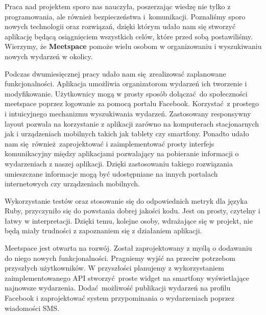 Praca nad projektem sporo nas nauczyła, poszerzając wiedzę nie tylko z programowania, ale również bezpieczeństwa i~komunikacji.
Poznaliśmy sporo nowych technologii oraz rozwiązań, dzięki którym udało nam się stworzyć aplikację będącą osiągnięciem wszystkich celów, które przed sobą postawiliśmy.
Wierzymy, że \textbf{Meetspace} pomoże wielu osobom w organizowaniu i wyszukiwaniu nowych wydarzeń w okolicy.

Podczas dwumiesięcznej pracy udało nam się zrealizować zaplanowane funkcjonalności.
Aplikacja umożliwia organizatorom wydarzeń ich tworzenie i modyfikowanie.
Użytkownicy mogą w prosty sposób dołączać do społeczności meetspace poprzez logowanie za pomocą portalu Facebook. Korzystać z prostego i intuicyjnego mechanizmu wyszukiwania wydarzeń.
Zastosowany responsywny layout pozwala na korzystanie z aplikacji zarówno na komputerach stacjonarnych jak i urządzeniach mobilnych takich jak tablety czy smartfony.
Ponadto udało nam się również zaprojektować i zaimplementować prosty interfejs komunikacyjny między aplikacjami pozwalający na pobieranie informacji o wydarzeniach z naszej aplikacji.
Dzięki zastosowaniu takiego rozwiązania umieszczane informacje mogą być udostępniane na innych portalach internetowych czy urządzeniach mobilnych.

Wykorzystanie testów oraz stosowanie się do odpowiednich metryk dla języka Ruby, przyczyniło się do powstania dobrej jakości kodu.
Jest on prosty, czytelny i łatwy w interpretacji.
Dzięki temu, kolejne osoby, wdrażające się w projekt, nie będą miały trudności z zapoznaniem się z działaniem aplikacji.

Meetspace jest otwarta na rozwój.
Został zaprojektowany z myślą o dodawaniu do niego nowych funkcjonalności.
Pragniemy wyjść na przeciw potrzebom przyszłych użytkowników.
W przyszłości planujemy z wykorzystaniem zaimplementowanego API stworzyć proste widget na smartfony wyświetlające najnowsze wydarzenia.
Dodać możliwość publikacji wydarzeń na profilu Facebook i zaprojektować system przypominania o wydarzeniach poprzez wiadomości SMS.
